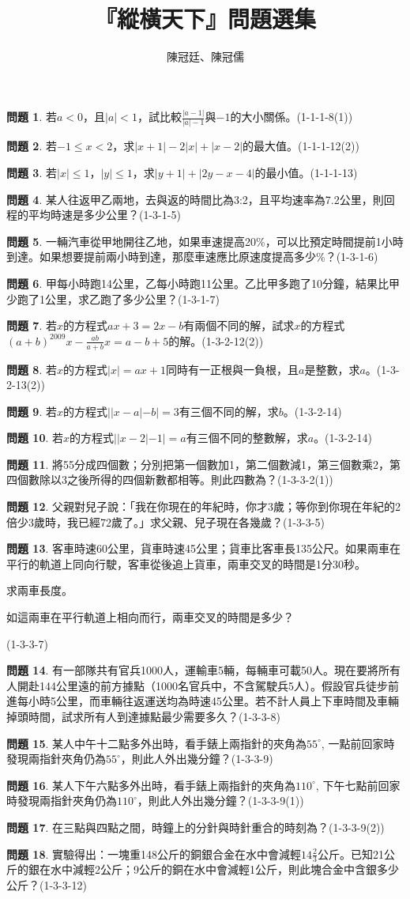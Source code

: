 \documentclass[12pt,a4paper]{article}
\theoremstyle{definition}
\newtheorem{prob}{問題}
\newcommand\prb[1]{\begin{prob}#1\end{prob}}
\begin{document}
\title{『縱橫天下』問題選集}
\author{陳冠廷、陳冠儒}
\maketitle

\prb{若$a<0$，且$|a|<1$，試比較$\frac{|a-1|}{|a|-1}$與$-1$的大小關係。(1-1-1-8(1))}
\prb{若$-1\leqslant x<2$，求$|x+1| - 2|x| + |x-2|$的最大值。(1-1-1-12(2))}
\prb{若$|x|\leqslant 1$，$|y|\leqslant 1$，求$|y+1| + |2y - x - 4|$的最小值。(1-1-1-13)}
\prb{某人往返甲乙兩地，去與返的時間比為3:2，且平均速率為7.2公里，則回程的平均時速是多少公里？(1-3-1-5)}
\prb{一輛汽車從甲地開往乙地，如果車速提高20\%，可以比預定時間提前1小時到達。如果想要提前兩小時到達，那麼車速應比原速度提高多少\%？(1-3-1-6)}
\prb{甲每小時跑14公里，乙每小時跑11公里。乙比甲多跑了10分鐘，結果比甲少跑了1公里，求乙跑了多少公里？(1-3-1-7)}
\prb{若$x$的方程式$ax+3 = 2x-b$有兩個不同的解，試求$x$的方程式$(a+b)^{2009}x-\frac{ab}{a+b} x = a - b +5$的解。(1-3-2-12(2))}
\prb{若$x$的方程式$|x| = ax+1$同時有一正根與一負根，且$a$是整數，求$a$。(1-3-2-13(2))}
\prb{若$x$的方程式$||x-a|-b|=3$有三個不同的解，求$b$。(1-3-2-14)}
\prb{若$x$的方程式$||x-2|-1|=a$有三個不同的整數解，求$a$。(1-3-2-14)}
\prb{將55分成四個數；分別把第一個數加1，第二個數減1，第三個數乘2，第四個數除以3之後所得的四個新數都相等。則此四數為？(1-3-3-2(1))}
\prb{父親對兒子說：「我在你現在的年紀時，你才3歲；等你到你現在年紀的2倍少3歲時，我已經72歲了。」求父親、兒子現在各幾歲？(1-3-3-5)}
\prb{客車時速60公里，貨車時速45公里；貨車比客車長135公尺。如果兩車在平行的軌道上同向行駛，客車從後追上貨車，兩車交叉的時間是1分30秒。
\begin{enumerate*}[(i)]
  \item 求兩車長度。
  \item 如這兩車在平行軌道上相向而行，兩車交叉的時間是多少？
\end{enumerate*}(1-3-3-7)}
\prb{有一部隊共有官兵1000人，運輸車5輛，每輛車可載50人。現在要將所有人開赴144公里遠的前方據點（1000名官兵中，不含駕駛兵5人）。假設官兵徒步前進每小時5公里，而車輛往返運送均為時速45公里。若不計人員上下車時間及車輛掉頭時間，試求所有人到達據點最少需要多久？(1-3-3-8)}
\prb{某人中午十二點多外出時，看手錶上兩指針的夾角為$55^\circ$, 一點前回家時發現兩指針夾角仍為$55^\circ$，則此人外出幾分鐘？(1-3-3-9)}
\prb{某人下午六點多外出時，看手錶上兩指針的夾角為$110^\circ$, 下午七點前回家時發現兩指針夾角仍為$110^\circ$，則此人外出幾分鐘？(1-3-3-9(1))}
\prb{在三點與四點之間，時鐘上的分針與時針重合的時刻為？(1-3-3-9(2))}
\prb{實驗得出：一塊重148公斤的銅銀合金在水中會減輕$14\frac{2}{3}$公斤。已知21公斤的銀在水中減輕2公斤；9公斤的銅在水中會減輕1公斤，則此塊合金中含銀多少公斤？(1-3-3-12)}
\end{document}
